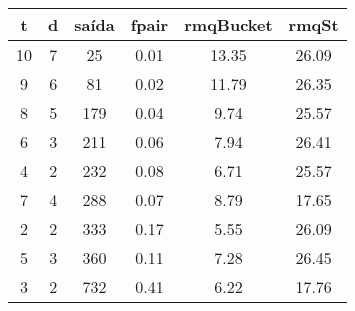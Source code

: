 \begin{tabular}{|c|c|c|c|c|c|}
\hline
\textbf{t} & \textbf{d} & \textbf{saída} & \textbf{fpair} & \textbf{rmqBucket} & \textbf{rmqSt}\\
\hline
10 & 7 & 25 & 0.01 & 13.35 & 26.09\\
\hline
9 & 6 & 81 & 0.02 & 11.79 & 26.35\\
\hline
8 & 5 & 179 & 0.04 & 9.74 & 25.57\\
\hline
6 & 3 & 211 & 0.06 & 7.94 & 26.41\\
\hline
4 & 2 & 232 & 0.08 & 6.71 & 25.57\\
\hline
7 & 4 & 288 & 0.07 & 8.79 & 17.65\\
\hline
2 & 2 & 333 & 0.17 & 5.55 & 26.09\\
\hline
5 & 3 & 360 & 0.11 & 7.28 & 26.45\\
\hline
3 & 2 & 732 & 0.41 & 6.22 & 17.76\\
\hline
\end{tabular}
